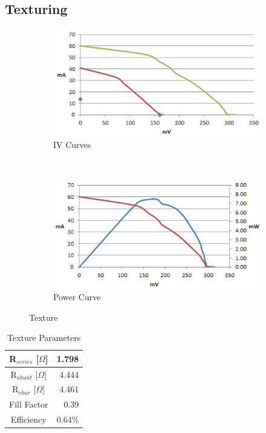 \documentclass[letter,12pt]{article}
\begin{document}
	\FloatBarrier
	\subsection{Texturing}
	
		\begin{figure}[h!]
			\centering
			\begin{subfigure}[b]{.45\textwidth}
				\includegraphics[width=\textwidth]{./Images/IV_Curves/Texture_IV.png}
				\caption{IV Curves}
			\end{subfigure}
			~
			\begin{subfigure}[b]{.45\textwidth}
				\includegraphics[width=\textwidth]{./Images/IV_Curves/Texture_PV.png}
				\caption{Power Curve}
			\end{subfigure}
			
			\caption{Texture}
			\label{fig:Texture}
		\end{figure}
		
		\begin{table}[h!]
			\centering
			\begin{tabular}{|c | r|}
				\hline
				R$_{series}$ [$\Omega$] & 1.798 \\
				\hline
				R$_{shunt}$ [$\Omega$] & 4.444 \\
				\hline
				R$_{char}$ [$\Omega$] & 4.461 \\
				\hline
				Fill Factor & 0.39 \\
				\hline
				Efficiency & 0.64\% \\
				\hline
			\end{tabular}
			\caption{Texture Parameters}
		\end{table}
	
\end{document}
